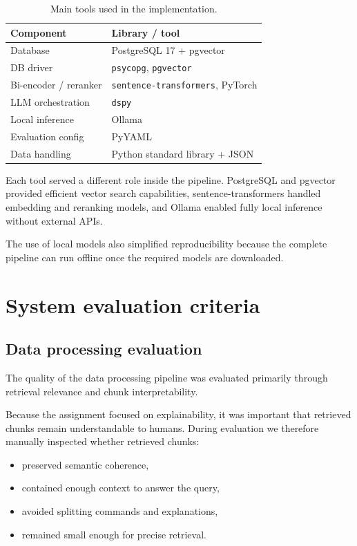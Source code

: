 \documentclass[11pt,a4paper]{article}
\begin{document}
\begin{table}[ht]
\centering
\small
\begin{tabular}{ll}
\toprule
Component & Library / tool \\
\midrule
Database & PostgreSQL 17 + pgvector \\
DB driver & \texttt{psycopg}, \texttt{pgvector} \\
Bi-encoder / reranker & \texttt{sentence-transformers}, PyTorch \\
LLM orchestration & \texttt{dspy} \\
Local inference & Ollama \\
Evaluation config & PyYAML \\
Data handling & Python standard library + JSON \\
\bottomrule
\end{tabular}
\caption{Main tools used in the implementation.}
\end{table}

Each tool served a different role inside the pipeline. PostgreSQL and pgvector provided efficient vector search capabilities, sentence-transformers handled embedding and reranking models, and Ollama enabled fully local inference without external APIs.

The use of local models also simplified reproducibility because the complete pipeline can run offline once the required models are downloaded.

\section{System evaluation criteria}

\subsection{Data processing evaluation}
The quality of the data processing pipeline was evaluated primarily through retrieval relevance and chunk interpretability.

Because the assignment focused on explainability, it was important that retrieved chunks remain understandable to humans. During evaluation we therefore manually inspected whether retrieved chunks:

\begin{itemize}
  \item preserved semantic coherence,
  \item contained enough context to answer the query,
  \item avoided splitting commands and explanations,
  \item remained small enough for precise retrieval.
\end{itemize}
\end{document}
